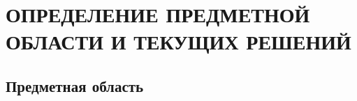 \section{ОПРЕДЕЛЕНИЕ ПРЕДМЕТНОЙ ОБЛАСТИ И ТЕКУЩИХ РЕШЕНИЙ}

\subsection{Предметная область}









